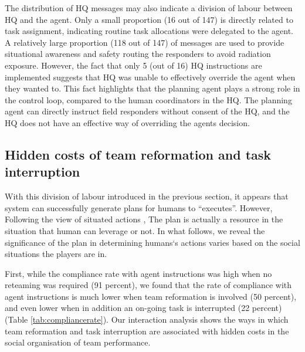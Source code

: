 The distribution of HQ messages may also indicate a division of labour between HQ and the agent. Only a small proportion (16 out of 147) is directly related to task assignment, indicating routine task allocations were delegated to the agent. A relatively large proportion (118 out of 147) of messages are used to provide situational awareness and safety routing the responders to avoid radiation exposure. However, the fact that only 5 (out of 16) HQ instructions are implemented suggests that HQ was unable to effectively override the agent when they wanted to. This fact highlights that the planning agent plays a strong role in the control loop, compared to the human coordinators in the HQ. The planning agent can directly instruct field responders without consent of the HQ, and the HQ does not have an effective way of overriding the agents decision. \\

\subsection{Hidden costs of team reformation and task interruption}\label{sec:study2social}
With this division of labour introduced in the previous section, it appears that system can successfully generate plans for humans to ``executes''. However, Following the view of situated actions \cite{Suchman1987}, The plan is actually a resource in the situation that human can leverage or not. In what follows, we reveal the significance of the plan in determining humans`s actions varies based on the social situations the players are in. 

First, while the compliance rate with agent instructions was high when no reteaming was required (91 percent), we found that the rate of compliance with agent instructions is much lower when team reformation is involved (50 percent), and even lower when in addition an on-going task is interrupted (22 percent) (Table \ref{tab:compliancerate}). Our interaction analysis shows the ways in which team reformation and task interruption are associated with hidden costs in the social organisation of team performance.  \\

